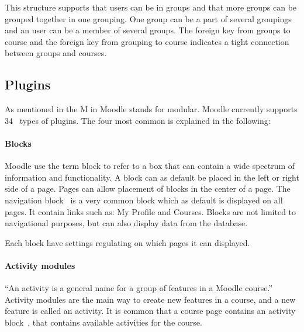 This structure supports that users can be in groups and that more groups can be grouped together in one grouping. 
One group can be a part of several groupings and an user can be a member of several groups. 
The foreign key from groups to course and the foreign key from grouping to course indicates a tight connection between groups and courses. 

\subsection{Plugins}
\label{sub:plugins}
As mentioned in  the M in Moodle stands for modular. 
Moodle currently supports 34~\cite{plugin} types of plugins.
The four most common is explained in the following:




\paragraph{Blocks}
\label{subsec:blocks}
Moodle use the term block to refer to a box that can contain a wide spectrum of information and functionality.
A block can as default be placed in the left or right side of a page. 
Pages can allow placement of blocks in the center of a page.
The navigation block~\cite{navigationblock} is a very common block which as default is displayed on all pages. 
It contain links such as: My Profile and Courses. 
Blocks are not limited to navigational purposes, but can also display data from the database.

Each block have settings regulating on which pages it can displayed. %




\paragraph{Activity modules}
``An activity is a general name for a group of features in a Moodle course.''~\cite{activity} 
Activity modules are the main way to create new features in a course, and a new feature is called an activity. 
It is common that a course page contains an activity block~\cite{activityblock}, that contains available activities for the course. 

